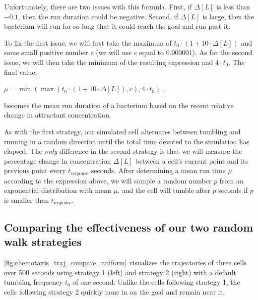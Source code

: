 Unfortunately, there are two issues with this formula. First, if $\Delta[L]$ is less than $-0.1$, then the run duration could be negative. Second, if $\Delta[L]$ is large, then the bacterium will run for so long that it could reach the goal and run past it.

To fix the first issue, we will first take the maximum of $t_0 \cdot (1 + 10 \cdot \Delta [L])$ and some small positive number $c$ (we will use $c$ equal to 0.000001). As for the second issue, we will then take the minimum of the resulting expression and $4 \cdot t_0$. The final value,

\begin{center}
$\mu = \min\left(\max(t_0 \cdot (1 + 10 \cdot \Delta [L]), c), 4 \cdot t_0\right)$\,,
\end{center}

\noindent becomes the mean run duration of a bacterium based on the recent relative change in attractant concentration.\\

\begin{qbox}\end{qbox}

As with the first strategy, our simulated cell alternates between tumbling and running in a random direction until the total time devoted to the simulation has elapsed. The \textit{only} difference in the second strategy is that we will measure the percentage change in concentration $\Delta [L]$ between a cell's current point and its previous point every $t_{\text{response}}$ seconds. After determining a mean run time $\mu$ according to the expression above, we will sample a random number $p$ from an exponential distribution with mean $\mu$, and the cell will tumble after $p$ seconds if $p$ is smaller than $t_{\text{response}}$.

\FloatBarrier
{}
\subsection{Comparing the effectiveness of our two random walk strategies}

\autoref{fig:chemotaxis_traj_compare_uniform} visualizes the trajectories of three cells over 500 seconds using strategy 1 (left) and strategy 2 (right) with a default tumbling frequency $t_0$ of one second. Unlike the cells following strategy 1, the cells following strategy 2 quickly hone in on the goal and remain near it.\\

